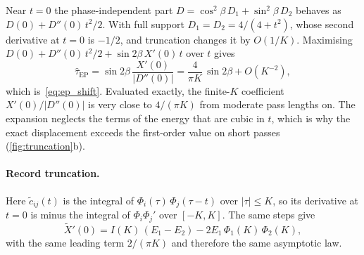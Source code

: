 Near $t = 0$ the phase-independent part $D = \cos^2\beta\, D_1 + \sin^2\beta\, D_2$ behaves as $D(0) + D''(0)\,t^2/2$. With full support $D_1 = D_2 = 4/(4 + t^2)$, whose second derivative at $t = 0$ is $-1/2$, and truncation changes it by $O(1/K)$. Maximising $D(0) + D''(0)\,t^2/2 + \sin 2\beta\, X'(0)\, t$ over $t$ gives
\begin{equation}
\hat{\tau}_{\mathrm{EP}} = \sin 2\beta\,\frac{X'(0)}{|D''(0)|} = \frac{4}{\pi K}\,\sin 2\beta + O(K^{-2}),
\label{eq:app_ep_shift}
\end{equation}
which is~\eqref{eq:ep_shift}. Evaluated exactly, the finite-$K$ coefficient $X'(0)/|D''(0)|$ is very close to $4/(\pi K)$ from moderate pass lengths on. The expansion neglects the terms of the energy that are cubic in $t$, which is why the exact displacement exceeds the first-order value on short passes (\cref{fig:truncation}b).

\paragraph{Record truncation.}
Here $\tilde{c}_{ij}(t)$ is the integral of $\Phi_i(\tau)\,\Phi_j(\tau - t)$ over $|\tau| \leq K$, so its derivative at $t = 0$ is minus the integral of $\Phi_i\Phi_j'$ over $[-K, K]$. The same steps give
\begin{equation}
\tilde{X}'(0) = I(K)\,(E_1 - E_2) - 2E_1\,\Phi_1(K)\,\Phi_2(K),
\label{eq:app_Xprime_record}
\end{equation}
with the same leading term $2/(\pi K)$ and therefore the same asymptotic law.

